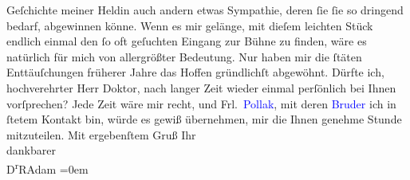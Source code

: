                Geſchichte meiner Heldin auch andern etwas Sympathie, deren ſie ſie so dringend
               bedarf, abgewinnen könne. Wenn es mir gelänge, mit dieſem leichten Stück endlich
               einmal den ſo oft geſuchten Eingang zur Bühne zu finden, wäre es natürlich für mich
               von allergrößter Bedeutung. Nur haben mir die ſtäten Enttäuſchungen früherer Jahre
               das Hoffen gründlichſt abgewöhnt.\pend
           \pstart
           {\pb}Dürfte ich, hochverehrter Herr Doktor,
               nach langer Zeit wieder einmal perſönlich bei Ihnen vorſprechen? Jede Zeit wäre mir
               recht, und Frl. \textcolor{blue}{Pollak}{}\ledrightnote{\textcolor{blue}{Frieda Pollak}}, mit deren \textcolor{blue}{Bruder}{} ich in ſtetem Kontakt
               bin, würde es gewiß übernehmen, mir die Ihnen genehme Stunde mitzuteilen.\pend
           \pstart
           Mit ergebenſtem Gruß Ihr{\\[\baselineskip]}dankbarer{\\[\baselineskip]}\spacefill\mbox{D\textsuperscript{r}RAdam}\pend
           \leftskip=0em{}\endnumbering{}  
      